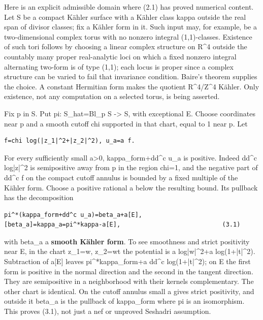\documentclass[11pt]{article}
\begin{document}
Here is an explicit admissible domain where (2.1) has proved numerical content. Let S be a compact Kähler surface with a Kähler class kappa outside the real span of divisor classes; fix a Kähler form in it. Such input may, for example, be a two-\allowbreak{}dimensional complex torus with no nonzero integral (1,1)-\allowbreak{}classes. Existence of such tori follows by choosing a linear complex structure on R\textasciicircum{}\allowbreak{}4 outside the countably many proper real-\allowbreak{}analytic loci on which a fixed nonzero integral alternating two-\allowbreak{}form is of type (1,1); each locus is proper since a complex structure can be varied to fail that invariance condition. Baire's theorem supplies the choice. A constant Hermitian form makes the quotient R\textasciicircum{}\allowbreak{}4/\allowbreak{}Z\textasciicircum{}\allowbreak{}4 Kähler. Only existence, not any computation on a selected torus, is being asserted.

Fix p in S. Put pi: S\_\allowbreak{}hat=\allowbreak{}Bl\_\allowbreak{}p S -\allowbreak{}> S, with exceptional E. Choose coordinates near p and a smooth cutoff chi supported in that chart, equal to 1 near p. Let

\begin{Verbatim}[breaklines=true,fontsize=\small]
f=chi log(|z_1|^2+|z_2|^2), u_a=a f.
\end{Verbatim}

For every sufficiently small a>0, kappa\_\allowbreak{}form+dd\textasciicircum{}\allowbreak{}c u\_\allowbreak{}a is positive. Indeed dd\textasciicircum{}\allowbreak{}c log|z|\textasciicircum{}\allowbreak{}2 is semipositive away from p in the region chi=\allowbreak{}1, and the negative part of dd\textasciicircum{}\allowbreak{}c f on the compact cutoff annulus is bounded by a fixed multiple of the Kähler form. Choose a positive rational a below the resulting bound. Its pullback has the decomposition

\begin{Verbatim}[breaklines=true,fontsize=\small]
pi^*(kappa_form+dd^c u_a)=beta_a+a[E],
[beta_a]=kappa_a=pi^*kappa-a[E],                            (3.1)
\end{Verbatim}

with beta\_\allowbreak{}a a \textbf{smooth Kähler form}. To see smoothness and strict positivity near E, in the chart z\_\allowbreak{}1=\allowbreak{}w, z\_\allowbreak{}2=\allowbreak{}wt the potential is a log|w|\textasciicircum{}\allowbreak{}2+a log(1+|t|\textasciicircum{}\allowbreak{}2). Subtraction of a[E] leaves pi\textasciicircum{}\allowbreak{}*kappa\_\allowbreak{}form+a dd\textasciicircum{}\allowbreak{}c log(1+|t|\textasciicircum{}\allowbreak{}2); on E the first form is positive in the normal direction and the second in the tangent direction. They are semipositive in a neighborhood with their kernels complementary. The other chart is identical. On the cutoff annulus small a gives strict positivity, and outside it beta\_\allowbreak{}a is the pullback of kappa\_\allowbreak{}form where pi is an isomorphism. This proves (3.1), not just a nef or unproved Seshadri assumption.
\end{document}
